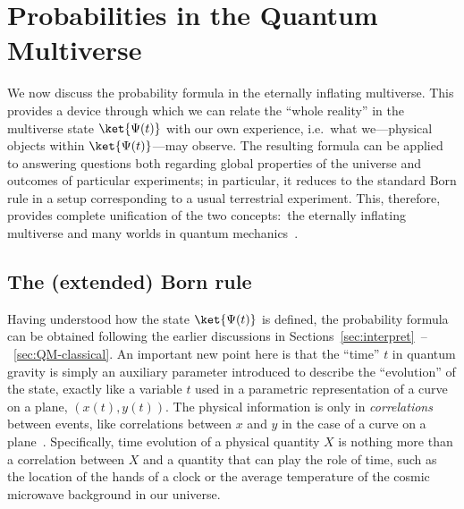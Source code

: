 \documentclass[12pt]{article}
\begin{document}
\section{Probabilities in the Quantum Multiverse}
\label{sec:measure}

We now discuss the probability formula in the eternally inflating multiverse. 
This provides a device through which we can relate the ``whole reality'' 
in the multiverse state $\ket{\Psi(t)}$ with our own experience, i.e.\ 
what we---physical objects within $\ket{\Psi(t)}$---may observe.  The 
resulting formula can be applied to answering questions both regarding 
global properties of the universe and outcomes of particular experiments; 
in particular, it reduces to the standard Born rule in a setup corresponding 
to a usual terrestrial experiment.  This, therefore, provides complete 
unification of the two concepts:\ the eternally inflating multiverse 
and many worlds in quantum mechanics~\cite{Nomura:2011dt}.


\subsection{The (extended) Born rule}
\label{subsec:Born}

Having understood how the state $\ket{\Psi(t)}$ is defined, the 
probability formula can be obtained following the earlier discussions 
in Sections~\ref{sec:interpret}~--~\ref{sec:QM-classical}.  An important 
new point here is that the ``time'' $t$ in quantum gravity is simply 
an auxiliary parameter introduced to describe the ``evolution'' of the 
state, exactly like a variable $t$ used in a parametric representation 
of a curve on a plane, $(x(t), y(t))$.  The physical information is 
only in {\it correlations} between events, like correlations between 
$x$ and $y$ in the case of a curve on a plane~\cite{DeWitt:1967yk}. 
Specifically, time evolution of a physical quantity $X$ is nothing more 
than a correlation between $X$ and a quantity that can play the role 
of time, such as the location of the hands of a clock or the average 
temperature of the cosmic microwave background in our universe.
\end{document}
